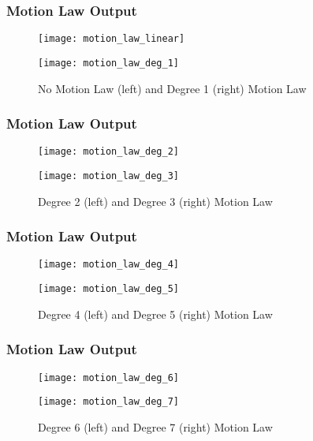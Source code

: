 \begin{frame}
	\frametitle{Motion Law Output}
	\begin{figure}[hb]
		\centering
		\begin{minipage}{0.45\textwidth}
			\texttt{[image: motion\_law\_linear]}
		\end{minipage}%
		\begin{minipage}{0.45\textwidth}
			\texttt{[image: motion\_law\_deg\_1]}
		\end{minipage}
		\caption{No Motion Law (left) and Degree 1 (right) Motion Law}
		\label{fig:motion_law_lin_1}
	\end{figure}
\end{frame}
\begin{frame}
	\frametitle{Motion Law Output}

	\begin{figure}[hb]
		\centering
		\begin{minipage}{0.45\textwidth}
			\texttt{[image: motion\_law\_deg\_2]}
		\end{minipage}%
		\begin{minipage}{0.45\textwidth}
			\texttt{[image: motion\_law\_deg\_3]}
		\end{minipage}%
		\caption{Degree 2 (left) and Degree 3 (right) Motion Law}
		\label{fig:motion_law_2_3}
	\end{figure}
\end{frame}

\begin{frame}
	\frametitle{Motion Law Output}

	\begin{figure}[hb]
		\centering
		\begin{minipage}{0.45\textwidth}
			\texttt{[image: motion\_law\_deg\_4]}
		\end{minipage}%
		\begin{minipage}{0.45\textwidth}
			\texttt{[image: motion\_law\_deg\_5]}
		\end{minipage}%
		\caption{Degree 4 (left) and Degree 5 (right) Motion Law}
		\label{fig:motion_law_4_5}
	\end{figure}
\end{frame}

\begin{frame}
	\frametitle{Motion Law Output}

	\begin{figure}[hb]
		\centering
		\begin{minipage}{0.45\textwidth}
			\texttt{[image: motion\_law\_deg\_6]}
		\end{minipage}%
		\begin{minipage}{0.45\textwidth}
			\texttt{[image: motion\_law\_deg\_7]}
		\end{minipage}%
		\caption{Degree 6 (left) and Degree 7 (right) Motion Law}
		\label{fig:motion_law_6_7}
	\end{figure}
\end{frame}
